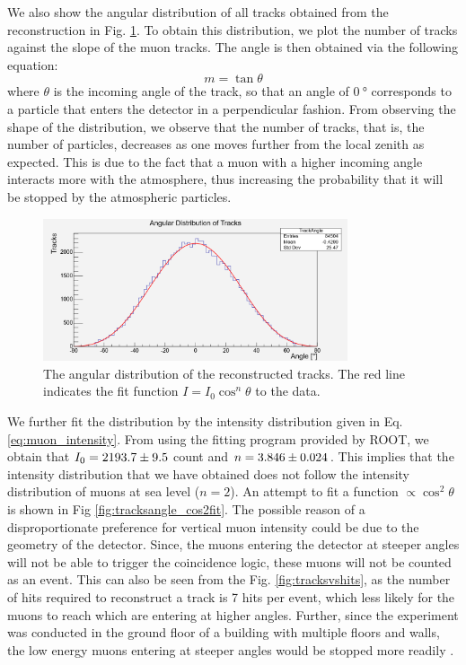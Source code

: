 \documentclass[a4paper]{report}
\numberwithin{equation}{section}
\begin{document}
We also show the angular distribution of all tracks obtained from the reconstruction in Fig. \ref{fig:tracksangle}. To obtain this distribution, we 
plot the number of tracks against the slope of the muon tracks. The angle is then obtained via the following equation:
\begin{equation}
	m = \tan \theta
\end{equation}
where $\theta$ is the incoming angle of the track, so that an angle of $\SI{0}{\degree}$ corresponds to a particle that enters the 
detector in a perpendicular fashion. From observing the shape of the distribution, we observe that the number of tracks, that is, 
the number of particles, decreases as one moves further from the local zenith as expected. This is due to the fact that a muon with a 
higher incoming angle interacts more with the atmosphere, thus increasing the probability that it will be stopped by the atmospheric
particles. \par 

\begin{figure}[htb!]
	\centering
	\includegraphics[width=0.8\textwidth]{trackangle.png}
	\caption{The angular distribution of the reconstructed tracks. The red line indicates the fit function $I = I_0 \cos^n \theta$
			to the data. }
	\label{fig:tracksangle}
\end{figure}


We further fit the distribution by the intensity distribution given in Eq. \ref{eq:muon_intensity}. From using the fitting 
program provided by ROOT, we obtain that $I_0 = \num{2193.7 \pm 9.5}$ count and $n = \num{3.846 \pm 0.024}$. This implies that 
the intensity distribution that we have obtained does not follow the intensity distribution of muons at sea level ($n = 2$). 
An attempt to fit a function $\propto \cos ^2 \theta$ is shown in Fig \ref{fig:tracksangle_cos2fit}. The possible reason of a disproportionate preference for vertical muon intensity could be due to the geometry of the detector. Since, the muons entering the detector at steeper angles will not be able to trigger the coincidence logic, these muons will not be counted as an event. This can also be seen from the Fig. \ref{fig:tracksvshits}, as the number of hits required to reconstruct a track is 7 hits per event, which less likely for the muons to reach which are entering at higher angles. Further, since the experiment was conducted in the ground floor of a building with multiple floors and walls, the low energy muons entering at steeper angles would be stopped more readily \cite{OlmosYanez:2019yqv}. 
\end{document}
